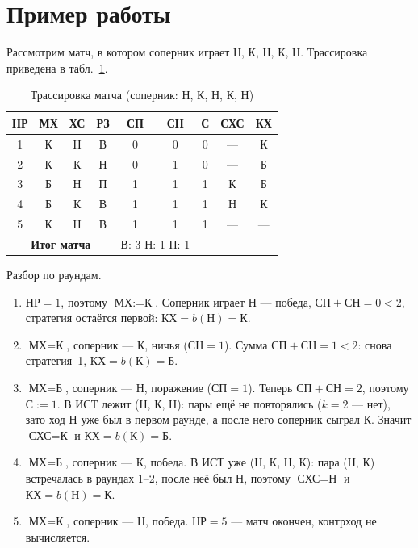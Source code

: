 \documentclass[a4paper,14pt]{extarticle}
\begin{document}
\section{Пример работы}

Рассмотрим матч, в котором соперник играет Н, К, Н, К, Н. Трассировка
приведена в табл.~\ref{tab:trace}.

\begin{table}[H]
\centering
\caption{Трассировка матча (соперник: Н, К, Н, К, Н)}
\label{tab:trace}
\begin{tabular}{|c|c|c|c|c|c|c|c|c|}
\hline
\textbf{НР} & \textbf{МХ} & \textbf{ХС} & \textbf{РЗ} & \textbf{СП} & \textbf{СН} &
\textbf{С} & \textbf{СХС} & \textbf{КХ}\\
\hline
1 & К & Н & В & 0 & 0 & 0 & --- & К\\
\hline
2 & К & К & Н & 0 & 1 & 0 & --- & Б\\
\hline
3 & Б & Н & П & 1 & 1 & 1 & К & Б\\
\hline
4 & Б & К & В & 1 & 1 & 1 & Н & К\\
\hline
5 & К & Н & В & 1 & 1 & 1 & --- & ---\\
\hline
\multicolumn{4}{|c|}{\textbf{Итог матча}} & \multicolumn{2}{c|}{В: 3 \quad Н: 1 \quad П: 1} &
\multicolumn{2}{c|}{} &\\
\hline
\end{tabular}
\end{table}

Разбор по раундам.

\begin{enumerate}
\item $\text{НР}=1$, поэтому $\text{МХ}:=\text{К}$. Соперник играет Н ---
      победа, $\text{СП}+\text{СН}=0<2$, стратегия остаётся первой:
      $\text{КХ}=b(\text{Н})=\text{К}$.
\item $\text{МХ}=\text{К}$, соперник --- К, ничья ($\text{СН}=1$). Сумма
      $\text{СП}+\text{СН}=1<2$: снова стратегия~1,
      $\text{КХ}=b(\text{К})=\text{Б}$.
\item $\text{МХ}=\text{Б}$, соперник --- Н, поражение ($\text{СП}=1$). Теперь
      $\text{СП}+\text{СН}=2$, поэтому $\text{С}:=1$. В ИСТ лежит (Н, К, Н):
      пары ещё не повторялись ($k=2$ --- нет), зато ход Н уже был в первом
      раунде, а после него соперник сыграл К. Значит $\text{СХС}=\text{К}$ и
      $\text{КХ}=b(\text{К})=\text{Б}$.
\item $\text{МХ}=\text{Б}$, соперник --- К, победа. В ИСТ уже (Н, К, Н, К):
      пара (Н, К) встречалась в раундах 1--2, после неё был Н, поэтому
      $\text{СХС}=\text{Н}$ и $\text{КХ}=b(\text{Н})=\text{К}$.
\item $\text{МХ}=\text{К}$, соперник --- Н, победа. $\text{НР}=5$ --- матч
      окончен, контрход не вычисляется.
\end{enumerate}
\end{document}
